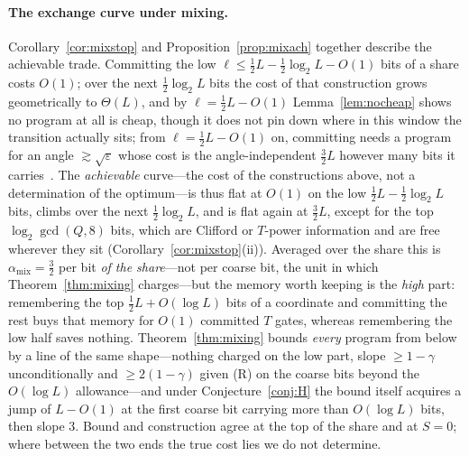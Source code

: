 \documentclass[aps,prx,twocolumn,superscriptaddress,nofootinbib,longbibliography]{revtex4-2}
\theoremstyle{plain}
\theoremstyle{definition}
\theoremstyle{remark}
\begin{document}
\paragraph{The exchange curve under mixing.} Corollary~\ref{cor:mixstop} and Proposition~\ref{prop:mixach} together describe the achievable trade. Committing the low $\ell\le\tfrac12L-\tfrac12\log_2L-O(1)$ bits of a share costs $O(1)$; over the next $\tfrac12\log_2L$ bits the cost of that construction grows geometrically to $\Theta(L)$, and by $\ell=\tfrac12L-O(1)$ Lemma~\ref{lem:nocheap} shows no program at all is cheap, though it does not pin down where in this window the transition actually sits; from $\ell=\tfrac12L-O(1)$ on, committing needs a program for an angle $\gtrsim\sqrt\varepsilon$ whose cost is the angle-independent $\tfrac32L$ however many bits it carries~\cite{KLMPP,Bothe}. The \emph{achievable} curve---the cost of the constructions above, not a determination of the optimum---is thus flat at $O(1)$ on the low $\tfrac12L-\tfrac12\log_2L$ bits, climbs over the next $\tfrac12\log_2L$, and is flat again at $\tfrac32L$, except for the top $\log_2\gcd(Q,8)$ bits, which are Clifford or $T$-power information and are free wherever they sit (Corollary~\ref{cor:mixstop}(ii)). Averaged over the share this is $\alpha_{\mathrm{mix}}=\tfrac32$ per bit \emph{of the share}---not per coarse bit, the unit in which Theorem~\ref{thm:mixing} charges---but the memory worth keeping is the \emph{high} part: remembering the top $\tfrac12L+O(\log L)$ bits of a coordinate and committing the rest buys that memory for $O(1)$ committed $T$ gates, whereas remembering the low half saves nothing. Theorem~\ref{thm:mixing} bounds \emph{every} program from below by a line of the same shape---nothing charged on the low part, slope $\ge1-\gamma$ unconditionally and $\ge2(1-\gamma)$ given (R) on the coarse bits beyond the $O(\log L)$ allowance---and under Conjecture~\ref{conj:H} the bound itself acquires a jump of $L-O(1)$ at the first coarse bit carrying more than $O(\log L)$ bits, then slope $3$. Bound and construction agree at the top of the share and at $S=0$; where between the two ends the true cost lies we do not determine.
\end{document}
